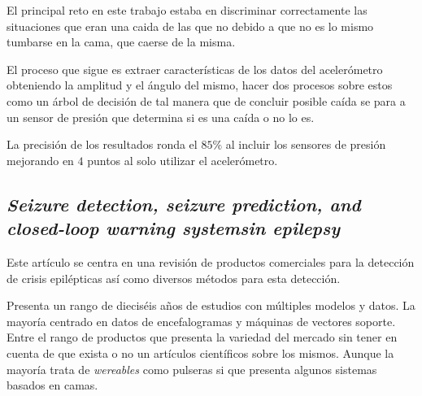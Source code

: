 El principal reto en este trabajo estaba en discriminar correctamente las situaciones que eran una caida de las que no debido a que no es lo mismo tumbarse en la cama, que caerse de la misma. 

El proceso que sigue es extraer características de los datos del acelerómetro obteniendo la amplitud y el ángulo del mismo, hacer dos procesos sobre estos como un árbol de decisión de tal manera que de concluir posible caída se para a un sensor de presión que determina si es una caída o no lo es.

La precisión de los resultados ronda el $85\%$ al incluir los sensores de presión mejorando en $4$ puntos al solo utilizar el acelerómetro.

\subsection{\textit{\textbf{Seizure detection, seizure prediction, and closed-loop warning systemsin epilepsy}}~\cite{ramgopal2014product_review}}

Este artículo se centra en una revisión de productos comerciales para la detección de crisis epilépticas así como diversos métodos para esta detección.

Presenta un rango de dieciséis años de estudios  con múltiples modelos y datos. La mayoría centrado en datos de encefalogramas y máquinas de vectores soporte. Entre el rango de productos que presenta la variedad del mercado sin tener en cuenta de que exista o no un artículos científicos sobre los mismos. Aunque la mayoría trata de \textit{wereables} como pulseras si que presenta algunos sistemas basados en camas.